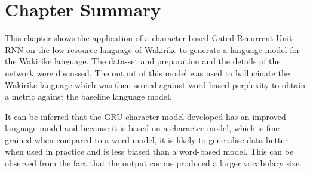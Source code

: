 \section{Chapter Summary}
This chapter shows the application of a character-based Gated Recurrent Unit RNN on the low resource language of Wakirike to generate a language model for the Wakirike language.  The data-set and preparation and the details of the network were discussed.  The output of this model was used to hallucinate the Wakirike language which was then scored against word-based perplexity to obtain a metric against the baseline language model.

It can be inferred that the GRU character-model developed has an improved language model and because it is based on a character-model, which is fine-grained when compared to a word model, it is likely to generalise data better when used in practice and is less biased than a word-based model.  This can be observed from the fact that the output corpus produced a larger vocabulary size.
